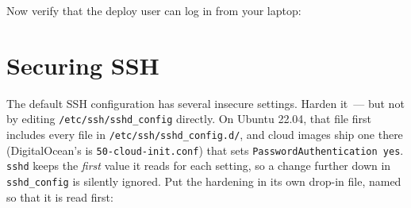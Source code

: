 \begin{codebox}[short]

\begin{Shaded}
\begin{Highlighting}[]
 

 
\end{Highlighting}
\end{Shaded}

\end{codebox}

\noindent{}Now verify that the deploy user can log in from your laptop:

\begin{codebox}[short]

\begin{Shaded}
\begin{Highlighting}[]
\end{Highlighting}
\end{Shaded}

\end{codebox}

\setcounter{section}{3}
\section{Securing SSH}\label{21-system-setup:214-securing-ssh}

The default SSH configuration has several insecure settings. Harden it~--- but not by editing \texttt{/}\allowbreak{}\texttt{etc/}\allowbreak{}\texttt{ssh/}\allowbreak{}\texttt{sshd\_config} directly. On Ubuntu 22.04, that file first includes every file in \texttt{/}\allowbreak{}\texttt{etc/}\allowbreak{}\texttt{ssh/}\allowbreak{}\texttt{sshd\_config.d/}, and cloud images ship one there (DigitalOcean's is \texttt{50-cloud-init.conf}) that sets \texttt{PasswordAuthentication\ yes}. \texttt{sshd} keeps the \emph{first} value it reads for each setting, so a change further down in \texttt{sshd\_config} is silently ignored. Put the hardening in its own drop-in file, named so that it is read first:


